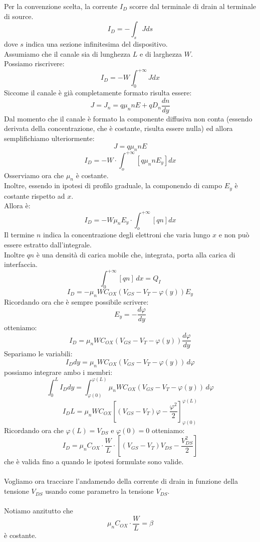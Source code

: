 \documentclass{article}
\numberwithin{equation}{subsection}
\begin{document}
	Per la convenzione scelta, la corrente $I_D$ scorre dal terminale di drain al terminale di source.
	$$I_D = -\int_s J ds$$
	dove $s$ indica una sezione infinitesima del dispositivo.\\
	Assumiamo che il canale sia di lunghezza $L$ e di larghezza $W$.\\
	Possiamo riscrivere:
	$$I_D = -W \int_0^{+\infty} J dx$$
	Siccome il canale è già completamente formato risulta essere:
	$$J = J_n = q\mu_n n E + qD_n \frac{dn}{dy}$$
	Dal momento che il canale è formato la componente diffusiva non conta (essendo derivata della concentrazione, che è costante, risulta essere nulla) ed allora semplifichiamo ulteriormente:
	$$J = q\mu_n n E$$
	$$I_D = -W \cdot \int_o^{+\infty} [q\mu_n n E_y] dx$$
	Osserviamo ora che $\mu_n$ è costante.\\
	Inoltre, essendo in ipotesi di profilo graduale, la componendo di campo $E_y$ è costante rispetto ad $x$.\\
	Allora è:
	$$I_D = -W \mu_n E_y \cdot \int_o^{+\infty} [qn] dx$$
	Il termine $n$ indica la concentrazione degli elettroni che varia lungo $x$ e non può essere estratto dall'integrale.\\
	Inoltre $qn$ è una densità di carica mobile che, integrata, porta alla carica di interfaccia.
	$$\int_0^{+\infty} [qn] \, dx = Q_I$$
	$$I_D = -\mu_n W C_{OX} (V_{GS} - V_T - \varphi(y)) E_y$$
	Ricordando ora che è sempre possibile scrivere:
	$$E_y = -\frac{d\varphi}{dy}$$
	otteniamo:
	$$I_D = \mu_n W C_{OX} (V_{GS} - V_T - \varphi(y)) \frac{d\varphi}{dy}$$
	Separiamo le variabili:
	$$I_D dy = \mu_n W C_{OX} (V_{GS} - V_T - \varphi(y)) \, d\varphi$$
	possiamo integrare ambo i membri:
	$$\int_0^L I_D dy = \int_{\varphi(0)}^{\varphi(L)} \mu_n W C_{OX} (V_{GS} - V_T - \varphi(y)) \, d\varphi$$
	$$I_D L = \mu_n W C_{OX} \left[ \left( V_{GS} - V_T\right) \varphi - \frac{\varphi^2}{2} \right]^{\varphi(L)}_{\varphi(0)}$$
	Ricordando ora che $\varphi(L) = V_{DS}$ e $\varphi(0) = 0$ otteniamo:
	$$I_D = \mu_n C_{OX} \cdot \frac{W}{L} \cdot \left[ (V_{GS} - V_T) V_{DS} - \frac{V_{DS}^2}{2} \right]$$
	che è valida fino a quando le ipotesi formulate sono valide.\\\\
	Vogliamo ora tracciare l'andamendo della corrente di drain in funzione della tensione $V_{DS}$ usando come parametro la tensione $V_{DS}$.\\\\
	Notiamo anzitutto che
	$$\mu_n C_{OX} \cdot \frac{W}{L} = \beta$$
	è costante.\\
\end{document}
